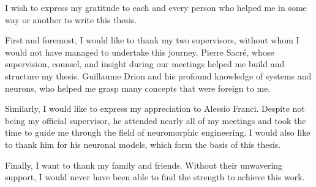 I wish to express my gratitude to each and every person who helped me in some way or another to write this thesis.

First and foremost, I would like to thank my two supervisors, without whom I would not have managed to undertake this journey.
Pierre Sacré, whose supervision, counsel, and insight during our meetings helped me build and structure my thesis.
Guillaume Drion and his profound knowledge of systems and neurons, who helped me grasp many concepts that were foreign to me.

Similarly, I would like to express my appreciation to Alessio Franci. Despite not being my official supervisor, he attended nearly all of my meetings and took the time to guide me through the field of neuromorphic engineering. I would also like to thank him for his neuronal models, which form the basis of this thesis.

Finally, I want to thank my family and friends. Without their unwavering support, I would never have been able to find the strength to achieve this work.

